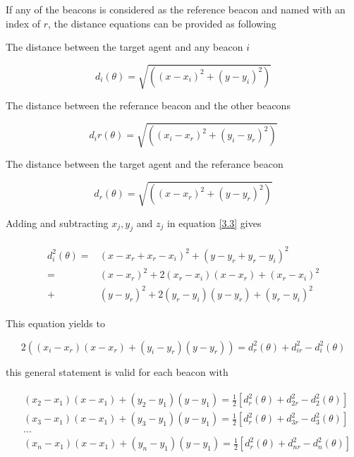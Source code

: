 If any of the beacons is considered as the reference beacon and named with an index of $r$, the distance equations can be provided as following

The distance between the target agent and any beacon $i$

\begin{equation} \label{3.3}
d_i(\theta) = \sqrt{\left((x - x_i)^2 + (y - y_i)^2\right)}
\end{equation}

The distance between the referance beacon and the other beacons

\begin{equation}
d_ir(\theta) = \sqrt{\left((x_i - x_r)^2 + (y_i - y_r)^2\right)}
\end{equation}

The distance between the target agent and the referance beacon

\begin{equation}
d_r(\theta) = \sqrt{\left((x - x_r)^2 + (y - y_r)^2\right)}
\end{equation}

Adding and subtracting $x_j, y_j$ and $z_j$ in equation \ref{3.3} gives

\begin{align}
\begin{split}
d_i^2(\theta) = & (x - x_r + x_r - x_i)^2 + (y - y_r + y_r - y_i)^2 \\ 
              = & (x - x_r)^2 + 2(x_r - x_i)(x - x_r) + (x_r-x_i)^2 \\
              + & (y - y_r)^2 + 2(y_r - y_i)(y - y_r) + (y_r - y_i)^2
\end{split}
\end{align}

This equation yields to

\begin{equation}
 2((x_i - x_r)(x - x_r) + (y_i - y_r)(y - y_r)) = d_r^2(\theta) + d_{ir}^2 - d_i^2(\theta)
\end{equation}

this general statement is valid for each beacon with

\begin{align}
\begin{split}
& (x_2 - x_1)(x - x_1) + (y_2 - y_1)(y - y_1) = \frac{1}{2} [d_r^2(\theta) + d_{2r}^2 - d_2^2(\theta)] \\
& (x_3 - x_1)(x - x_1) + (y_3 - y_1)(y - y_1) = \frac{1}{2} [d_r^2(\theta) + d_{3r}^2 - d_3^2(\theta)] \\
& ... \\
& (x_n - x_1)(x - x_1) + (y_n - y_1)(y - y_1) = \frac{1}{2} [d_r^2(\theta) + d_{nr}^2 - d_n^2(\theta)]
\end{split}
\end{align}


